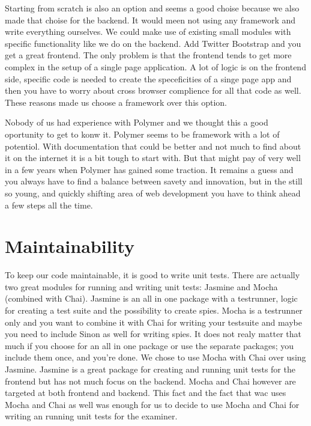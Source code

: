 Starting from scratch is also an option
and seems a good choise because we also made that choise for the backend.
It would meen not using any framework and write everything ourselves.
We could make use of existing small modules with specific functionality
like we do on the backend.
Add Twitter Bootstrap and you get a great frontend.
The only problem is that the frontend tends to get more complex
in the setup of a single page application.
A lot of logic is on the frontend side,
specific code is needed to create the speceficities of a singe page app
and then you have to worry about cross browser complience
for all that code as well.
These reasons made us choose a framework over this option.

Nobody of us had experience with Polymer
and we thought this a good oportunity to get to konw it.
Polymer seems to be framework with a lot of potentiol.
With documentation that could be better
and not much to find about it on the internet
it is a bit tough to start with.
But that might pay of very well in a few years
when Polymer has gained some traction.
It remains a guess and you always have to find a balance
between savety and innovation,
but in the still so young, and quickly shifting area of web development
you have to think ahead a few steps all the time.

\section{Maintainability}
To keep our code maintainable, it is good to write unit tests.
There are actually two great modules for running and writing unit tests:
Jasmine and Mocha (combined with Chai).
Jasmine is an all in one package with a testrunner,
logic for creating a test suite and the possibility to create spies.
Mocha is a testrunner only
and you want to combine it with Chai for writing your testsuite
and maybe you need to include Sinon as well for writing spies.
It does not realy matter that much if you choose for an all in one package
or use the separate packages; you include them once, and you're done.
We chose to use Mocha with Chai over using Jasmine.
Jasmine is a great package for creating and running unit tests for the frontend
but has not much focus on the backend.
Mocha and Chai however are targeted at both frontend and backend.
This fact and the fact that \gls{wac} uses Mocha and Chai as well
was enough for us to decide to use Mocha and Chai
for writing an running unit tests for the \gls{examiner}.

